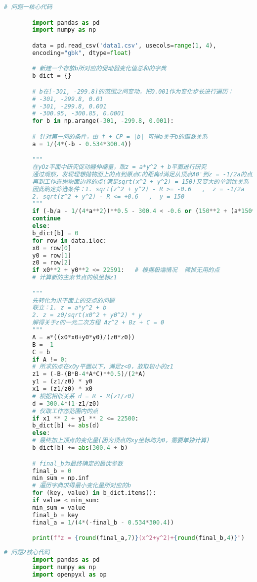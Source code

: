 \documentclass{cumcmthesis}
\begin{document}
\begin{appendices}  
		\begin{lstlisting}[language={python}]  
		# 问题一核心代码

		import pandas as pd
		import numpy as np

		data = pd.read_csv('data1.csv', usecols=range(1, 4),
		encoding="gbk", dtype=float)

		# 新建一个存放b所对应的促动器变化值总和的字典
		b_dict = {}

		# b在[-301, -299.8]的范围之间变动，把0.001作为变化步长进行遍历：
		# -301, -299.8, 0.01
		# -301, -299.8, 0.001
		# -300.95, -300.85, 0.0001
		for b in np.arange(-301, -299.8, 0.001):

		# 针对第一问的条件，由 f + CP = |b| 可得a关于b的函数关系
		a = 1/(4*(-b - 0.534*300.4))

		"""
		在yOz平面中研究促动器伸缩量，取z = a*y^2 + b平面进行研究
		通过观察，发现理想抛物面上的点到原点C的距离d满足从顶点A0'到z = -1/2a的点先变小，
		再到工作态抛物面边界的点(满足sqrt(x^2 + y^2) = 150)又变大的单调性关系
		因此确定筛选条件：1. sqrt(z^2 + y^2) - R >= -0.6   ,  z = -1/2a
		2. sqrt(z^2 + y^2) - R <= +0.6   ,  y = 150
		"""
		if (-b/a - 1/(4*a**2))**0.5 - 300.4 < -0.6 or (150**2 + (a*150**2+b)**2)**0.5 - 300.4 > 0.6:
		continue
		else:
		b_dict[b] = 0
		for row in data.iloc:
		x0 = row[0]
		y0 = row[1]
		z0 = row[2]
		if x0**2 + y0**2 <= 22591:   # 根据极端情况  筛掉无用的点
		# 计算新的主索节点的纵坐标z1

		"""
		先转化为求平面上的交点的问题
		联立：1. z = a*y^2 + b
		2. z = z0/sqrt(x0^2 + y0^2) * y
		解得关于z的一元二次方程 Az^2 + Bz + C = 0
		"""
		A = a*((x0*x0+y0*y0)/(z0*z0))
		B = -1
		C = b
		if A != 0:
		# 所求的点在xOy平面以下，满足z<0，故取较小的z1
		z1 = (-B-(B*B-4*A*C)**0.5)/(2*A)
		y1 = (z1/z0) * y0
		x1 = (z1/z0) * x0
		# 根据相似关系 d = R - R(z1/z0)
		d = 300.4*(1-z1/z0)
		# 仅取工作态范围内的点
		if x1 ** 2 + y1 ** 2 <= 22500:
		b_dict[b] += abs(d)
		else:
		# 最终加上顶点的变化量(因为顶点的xy坐标均为0，需要单独计算)
		b_dict[b] += abs(300.4 + b)

		# final_b为最终确定的最优参数
		final_b = 0
		min_sum = np.inf
		# 遍历字典求得最小变化量所对应的b
		for (key, value) in b_dict.items():
		if value < min_sum:
		min_sum = value
		final_b = key
		final_a = 1/(4*(-final_b - 0.534*300.4))

		print(f"z = {round(final_a,7)}(x^2+y^2)+{round(final_b,4)}")

		\end{lstlisting}  %
		\begin{lstlisting}[language={python}]  
		# 问题2核心代码
		import pandas as pd
		import numpy as np
		import openpyxl as op


\end{lstlisting}
\end{appendices}
\end{document}
